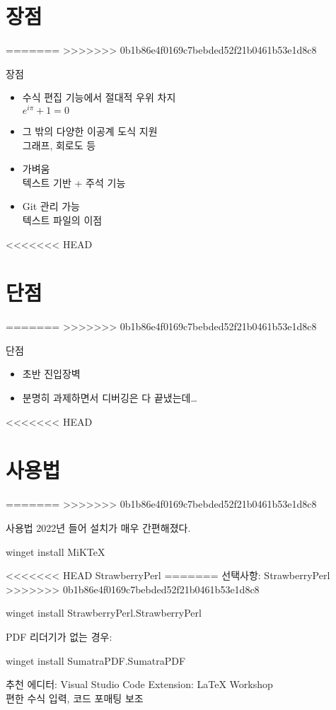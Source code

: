 \documentclass{beamer}
\begin{document}
\section{장점}
=======
>>>>>>> 0b1b86e4f0169c7bebded52f21b0461b53e1d8c8
\begin{frame}{장점}
    \begin{itemize}
        \item 수식 편집 기능에서 절대적 우위 차지\\
              $e^{i\pi}+1=0$
        \item 그 밖의 다양한 이공계 도식 지원\\
              그래프, 회로도 등
        \item 가벼움\\
              텍스트 기반 + 주석 기능
        \item Git 관리 가능\\
              텍스트 파일의 이점
    \end{itemize}
\end{frame}

<<<<<<< HEAD
\section{단점}
=======
>>>>>>> 0b1b86e4f0169c7bebded52f21b0461b53e1d8c8
\begin{frame}{단점}
    \begin{itemize}
        \item 초반 진입장벽
        \item 분명히 과제하면서 디버깅은 다 끝냈는데\dots
    \end{itemize}
\end{frame}

<<<<<<< HEAD
\section{사용법}
=======
>>>>>>> 0b1b86e4f0169c7bebded52f21b0461b53e1d8c8
\begin{frame}{사용법}
    2022년 들어 설치가 매우 간편해졌다.
    \begin{semiverbatim}
        winget install MiKTeX
    \end{semiverbatim}

<<<<<<< HEAD
    StrawberryPerl
=======
    선택사항: StrawberryPerl
>>>>>>> 0b1b86e4f0169c7bebded52f21b0461b53e1d8c8
    \begin{semiverbatim}
        winget install StrawberryPerl.StrawberryPerl
    \end{semiverbatim}

    PDF 리더기가 없는 경우:
    \begin{semiverbatim}
        winget install SumatraPDF.SumatraPDF
    \end{semiverbatim}

    \begin{block}{추천 에디터: Visual Studio Code}
        Extension: LaTeX Workshop\\
        편한 수식 입력, 코드 포매팅 보조
    \end{block}
\end{frame}
\end{document}
